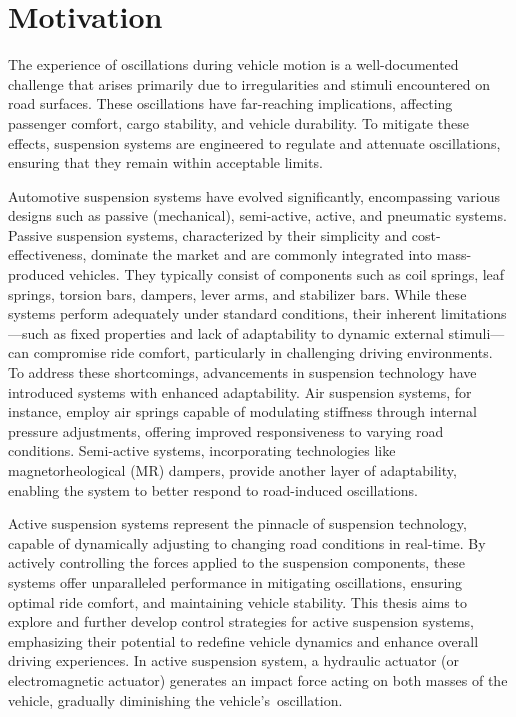 \section{Motivation}
The experience of oscillations during vehicle motion is a well-documented challenge that arises primarily due to irregularities and stimuli encountered on road surfaces. These oscillations have far-reaching implications, affecting passenger comfort, cargo stability, and vehicle durability. To mitigate these effects, suspension systems are engineered to regulate and attenuate oscillations, ensuring that they remain within acceptable limits.

Automotive suspension systems have evolved significantly, encompassing various designs such as passive (mechanical), semi-active, active, and pneumatic systems. Passive suspension systems, characterized by their simplicity and cost-effectiveness, dominate the market and are commonly integrated into mass-produced vehicles. They typically consist of components such as coil springs, leaf springs, torsion bars, dampers, lever arms, and stabilizer bars. While these systems perform adequately under standard conditions, their inherent limitations—such as fixed properties and lack of adaptability to dynamic external stimuli—can compromise ride comfort, particularly in challenging driving environments. To address these shortcomings, advancements in suspension technology have introduced systems with enhanced adaptability. Air suspension systems, for instance, employ air springs capable of modulating stiffness through internal pressure adjustments, offering improved responsiveness to varying road conditions. Semi-active systems, incorporating technologies like magnetorheological (MR) dampers, provide another layer of adaptability, enabling the system to better respond to road-induced oscillations.

Active suspension systems represent the pinnacle of suspension technology, capable of dynamically adjusting to changing road conditions in real-time. By actively controlling the forces applied to the suspension components, these systems offer unparalleled performance in mitigating oscillations, ensuring optimal ride comfort, and maintaining vehicle stability. This thesis aims to explore and further develop control strategies for active suspension systems, emphasizing their potential to redefine vehicle dynamics and enhance overall driving experiences. In active suspension system, a hydraulic actuator (or electromagnetic actuator) generates an impact force acting on both masses of the vehicle, gradually diminishing the vehicle's oscillation.\cite{nguyen2023design}


